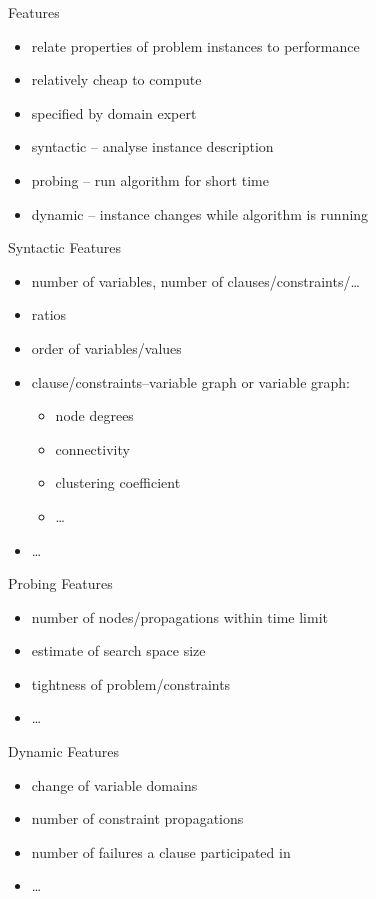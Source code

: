 \begin{frame}{Features}
\begin{itemize}
\item relate properties of problem instances to performance
\item relatively cheap to compute
\item specified by domain expert
\item syntactic -- analyse instance description
\item probing -- run algorithm for short time
\item dynamic -- instance changes while algorithm is running
\end{itemize}
\end{frame}

\begin{frame}{Syntactic Features}
\begin{itemize}
\item number of variables, number of clauses/constraints/\ldots
\item ratios
\item order of variables/values
\item clause/constraints--variable graph or variable graph:
    \begin{itemize}
    \item node degrees
    \item connectivity
    \item clustering coefficient
    \item \ldots
    \end{itemize}
\item \ldots
\end{itemize}
\end{frame}

\begin{frame}{Probing Features}
\begin{itemize}
\item number of nodes/propagations within time limit
\item estimate of search space size
\item tightness of problem/constraints
\item \ldots
\end{itemize}
\end{frame}

\begin{frame}{Dynamic Features}
\begin{itemize}
\item change of variable domains
\item number of constraint propagations
\item number of failures a clause participated in
\item \ldots
\end{itemize}
\end{frame}

